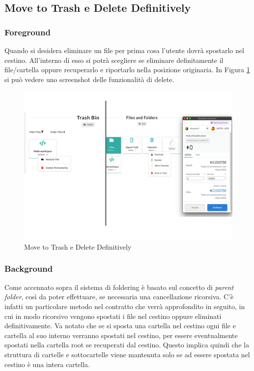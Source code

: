 \documentclass{article}
\begin{document}
\subsection{Move to Trash e Delete Definitively}
\subsubsection{Foreground}
Quando si desidera eliminare un file per prima cosa l'utente dovrà spostarlo nel cestino. All'interno di esso si potrà scegliere se eliminare definitamente il file/cartella oppure recuperarlo e riportarlo nella posizione originaria. In Figura \ref{fig:moveTrash} si può vedere uno screenshot delle funzionalità di delete.

\begin{figure}[!ht]
  \includegraphics[width=14cm]{images/moveTrash.png}
  \centering
  \caption{Move to Trash e Delete Definitively}
  \label{fig:moveTrash}
\end{figure}

\subsubsection{Background}
Come accennato sopra il sistema di foldering è basato sul concetto di \textit{parent folder}, così da poter effettuare, se necessaria una cancellazione ricorsiva. C'è infatti un particolare metodo nel contratto che verrà approfondito in seguito, in cui in modo ricorsivo vengono spostati i file nel cestino oppure eliminati definitivamente. Va notato che se si sposta una cartella nel cestino ogni file e cartella al suo interno verranno spostati nel cestino, per essere eventualmente spostati nella cartella root se recuperati dal cestino. Questo implica quindi che la struttura di cartelle e sottocartelle viene mantenuta solo se ad essere spostata nel cestino è una intera cartella.
\end{document}
